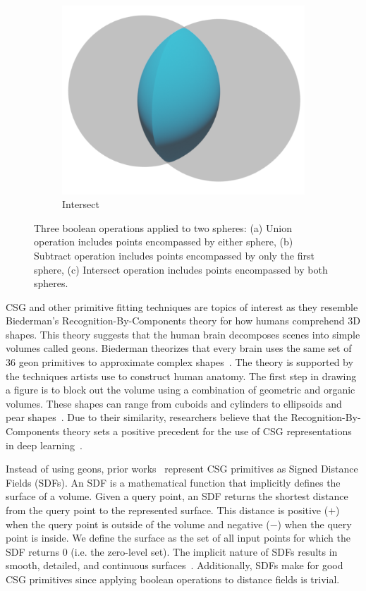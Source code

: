 \begin{figure}
\begin{subfigure}[t]{0.3\textwidth}
		\includegraphics[width=\textwidth]{Images/Intersect}
		\caption{Intersect}
	\end{subfigure}
	\caption{Three boolean operations applied to two spheres: (a) Union operation includes points encompassed by either sphere, (b) Subtract operation includes points encompassed by only the first sphere, (c) Intersect operation includes points encompassed by both spheres.}
	\label{fig:boolean operations}
\end{figure}

CSG and other primitive fitting techniques are topics of interest as they resemble Biederman's Recognition-By-Components theory for how humans comprehend 3D shapes. This theory suggests that the human brain decomposes scenes into simple volumes called geons. Biederman theorizes that every brain uses the same set of 36 geon primitives to approximate complex shapes~\cite{Biederman1987}. The theory is supported by the techniques artists use to construct human anatomy. The first step in drawing a figure is to block out the volume using a combination of geometric and organic volumes. These shapes can range from cuboids and cylinders to ellipsoids and pear shapes~\cite{Winslow2015}. Due to their similarity, researchers believe that the Recognition-By-Components theory sets a positive precedent for the use of CSG representations in deep learning~\cite{Sharma2018}.

Instead of using geons, prior works~\cite{Sharma2018, Kania2020, Ren2021} represent CSG primitives as Signed Distance Fields (SDFs). An SDF is a mathematical function that implicitly defines the surface of a volume. Given a query point, an SDF returns the shortest distance from the query point to the represented surface. This distance is positive ($+$) when the query point is outside of the volume and negative ($-$) when the query point is inside. We define the surface as the set of all input points for which the SDF returns 0 (i.e. the zero-level set). The implicit nature of SDFs results in smooth, detailed, and continuous surfaces~\cite{Park2019}. Additionally, SDFs make for good CSG primitives since applying boolean operations to distance fields is trivial.

